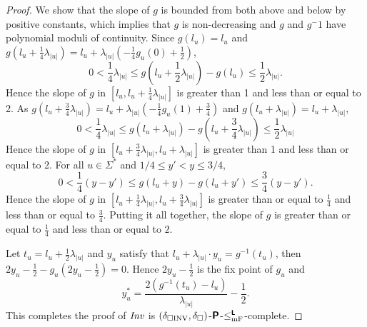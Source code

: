 \documentclass{article}
\theoremstyle{definition}
\theoremstyle{remark}
\begin{document}
\begin{proof}
We show that the slope of $g$ is bounded from both above and below
by positive constants, which implies that $g$ is non-decreasing and 
$g$ and $g^-1$ have polynomial moduli of continuity.
Since $g(l_u)=l_u$ and 
$g(l_u+\frac{1}{4}\lambda_{|u|}) = l_u + \lambda_{|u|}(-\frac{1}{4}g_u(0) + \frac{1}{2})$,
\begin{equation}
 0 < \frac{1}{4}\lambda_{|u|}
 \le g \left( l_u+ \frac{1}{2} \lambda_{|u|} \right) - g(l_u)
 \le \frac{1}{2}\lambda_{|u|}.
\end{equation}
Hence the slope of $g$ in $[l_u, l_u + \frac{1}{4}\lambda_{|u|}]$ is 
greater than 1 and less than or equal to 2.
As $g(l_u+\frac{3}{4}\lambda_{|u|}) = l_u + \lambda_{|u|}(-\frac{1}{4}g_u(1) + \frac{3}{4})$ and
$g(l_u+\lambda_{|u|}) = l_u+\lambda_{|u|}$,
\begin{equation}
 0 < \frac{1}{4}\lambda_{|u|}
 \le g(l_u+\lambda_{|u|}) - g \left(l_u+ \frac 3 4 \lambda_{|u|} \right)
 \le \frac{1}{2}\lambda_{|u|}
\end{equation}
Hence the slope of $g$ in $[l_u + \frac{3}{4}\lambda_{|u|}, l_u + \lambda_{|u|}]$ is greater than 1 and less than or equal to 2.
For all $u \in \Sigma^*$ and $1/4 \le y' < y \le 3/4$,
\begin{equation}
0 < \frac{1}{4}(y - y') \le g(l_u+y) - g(l_u+y') \le \frac{3}{4}(y - y').
\end{equation}
Hence the slope of $g$ in $[l_u + \frac{1}{4}\lambda_{|u|}, l_u + \frac{3}{4}\lambda_{|u|}]$ 
is greater than or equal to $\frac{1}{4}$ and less than or equal to $\frac{3}{4}$.
Putting it all together, the slope of $g$ is greater than or equal to $\frac{1}{4}$ and less than or equal to $2$.

Let $t_u = l_u + \frac{1}{2}\lambda_{|u|}$ and $y_u$ satisfy that 
$l_u + \lambda_{|u|} \cdot y_u = g^{-1}(t_u)$, then
$2y_u - \frac{1}{2} - g_u (2y_u - \frac{1}{2}) = 0$.
Hence $2y_u - \frac{1}{2}$ is the fix point of $g_u$ and 
\begin{equation}
 y^*_u = \frac{2\left( g^{-1}(t_u) - l_u \right)}{\lambda_{|u|}} - \frac{1}{2}.
\end{equation}
This completes the proof of $\mathit{Inv}$ is $(\delta _{\square \mathrm{INV}}, \delta _\square)$-$\text{\bfseries \sffamily \upshape P}$-$\leq _{\mathrm{mF}} ^{\text{\bfseries \sffamily \upshape L}}$-complete.
\end{proof}
\end{document}
